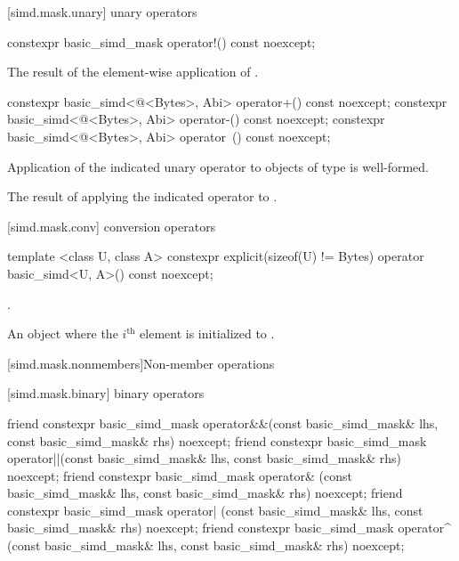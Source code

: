 [simd.mask.unary]{ unary operators}

\begin{itemdecl}
constexpr basic_simd_mask operator!() const noexcept;
\end{itemdecl}

\begin{itemdescr}
  \pnum\returns
  The result of the element-wise application of .
\end{itemdescr}

\begin{itemdecl}
constexpr basic_simd<@\integerfrom@<Bytes>, Abi> operator+() const noexcept;
constexpr basic_simd<@\integerfrom@<Bytes>, Abi> operator-() const noexcept;
constexpr basic_simd<@\integerfrom@<Bytes>, Abi> operator~() const noexcept;
\end{itemdecl}

\begin{itemdescr}
  \pnum\constraints
  Application of the indicated unary operator to objects of type  is well-formed.

  \pnum\returns
  The result of applying the indicated operator to .
\end{itemdescr}

[simd.mask.conv]{ conversion operators}

\begin{itemdecl}
template <class U, class A>
  constexpr explicit(sizeof(U) != Bytes) operator basic_simd<U, A>() const noexcept;
\end{itemdecl}

\begin{itemdescr}
  \pnum\constraints
  .

  \pnum\returns
  An object where the $i^\text{th}$ element is initialized to .
\end{itemdescr}

[simd.mask.nonmembers]{Non-member operations}

[simd.mask.binary]{ binary operators}

\begin{itemdecl}
friend constexpr basic_simd_mask
  operator&&(const basic_simd_mask& lhs, const basic_simd_mask& rhs) noexcept;
friend constexpr basic_simd_mask
  operator||(const basic_simd_mask& lhs, const basic_simd_mask& rhs) noexcept;
friend constexpr basic_simd_mask
  operator& (const basic_simd_mask& lhs, const basic_simd_mask& rhs) noexcept;
friend constexpr basic_simd_mask
  operator| (const basic_simd_mask& lhs, const basic_simd_mask& rhs) noexcept;
friend constexpr basic_simd_mask
  operator^ (const basic_simd_mask& lhs, const basic_simd_mask& rhs) noexcept;
\end{itemdecl}

